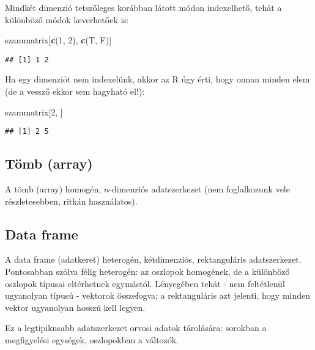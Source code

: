 \documentclass[]{book}
\newenvironment{Shaded}{\begin{snugshade}}{\end{snugshade}}
\newcommand{\DecValTok}[1]{\textcolor[rgb]{0.00,0.00,0.81}{#1}}
\newcommand{\KeywordTok}[1]{\textcolor[rgb]{0.13,0.29,0.53}{\textbf{#1}}}
\newcommand{\NormalTok}[1]{#1}
\begin{document}
Mindkét dimenzió tetszőleges korábban látott módon indexelhető, tehát a különböző módok keverhetőek is:

\begin{Shaded}
\begin{Highlighting}[]
\NormalTok{szammatrix[}\KeywordTok{c}\NormalTok{(}\DecValTok{1}\NormalTok{, }\DecValTok{2}\NormalTok{), }\KeywordTok{c}\NormalTok{(T, F)]}
\end{Highlighting}
\end{Shaded}

\begin{verbatim}
## [1] 1 2
\end{verbatim}

Ha egy dimenziót nem indexelünk, akkor az R úgy érti, hogy onnan minden elem (de a vessző ekkor sem hagyható el!):

\begin{Shaded}
\begin{Highlighting}[]
\NormalTok{szammatrix[}\DecValTok{2}\NormalTok{, ]}
\end{Highlighting}
\end{Shaded}

\begin{verbatim}
## [1] 2 5
\end{verbatim}

\hypertarget{tuxf6mb-array}{%
\subsection{Tömb (array)}\label{tuxf6mb-array}}

A tömb (array) homogén, \(n\)-dimenziós adatszerkezet (nem foglalkozunk vele részletesebben, ritkán használatos).

\hypertarget{data-frame}{%
\subsection{Data frame}\label{data-frame}}

A data frame (adatkeret) heterogén, kétdimenziós, rektanguláris adatszerkezet. Pontosabban szólva félig heterogén: az oszlopok homogének, de a különböző oszlopok típusai eltérhetnek egymástól. Lényegében tehát - nem feltétlenül ugyanolyan típusú - vektorok összefogva; a rektanguláris azt jelenti, hogy minden vektor ugyanolyan hosszú kell legyen.

Ez a legtipikusabb adatszerkezet orvosi adatok tárolására: sorokban a megfigyelési egységek, oszlopokban a változók.
\end{document}

